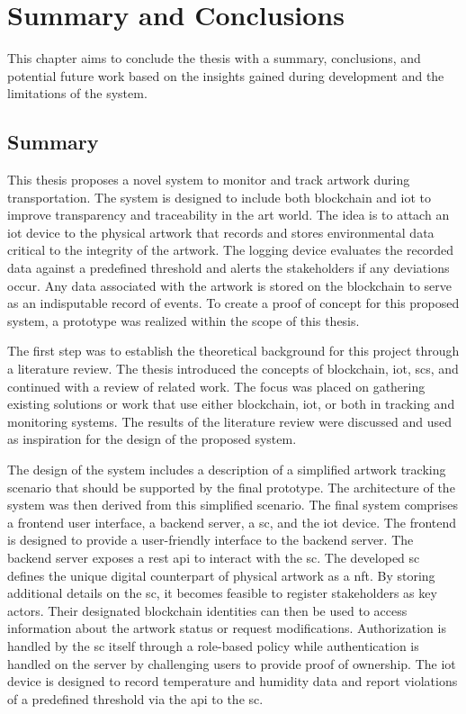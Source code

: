 \chapter{Summary and Conclusions}
\label{chap:summary}
This chapter aims to conclude the thesis with a summary, conclusions, and potential future work based on the insights gained during development and the limitations of the system.

\section{Summary}
This thesis proposes a novel system to monitor and track artwork during transportation. The system is designed to include both blockchain and \gls{iot} to improve transparency and traceability in the art world. The idea is to attach an \gls{iot} device to the physical artwork that records and stores environmental data critical to the integrity of the artwork. The logging device evaluates the recorded data against a predefined threshold and alerts the stakeholders if any deviations occur. Any data associated with the artwork is stored on the blockchain to serve as an indisputable record of events. To create a proof of concept for this proposed system, a prototype was realized within the scope of this thesis.

The first step was to establish the theoretical background for this project through a literature review. The thesis introduced the concepts of blockchain, \gls{iot}, \glspl{sc}, and continued with a review of related work. The focus was placed on gathering existing solutions or work that use either blockchain, \gls{iot}, or both in tracking and monitoring systems. The results of the literature review were discussed and used as inspiration for the design of the proposed system.

The design of the system includes a description of a simplified artwork tracking scenario that should be supported by the final prototype. The architecture of the system was then derived from this simplified scenario. The final system comprises a frontend user interface, a backend server, a \gls{sc}, and the \gls{iot} device. The frontend is designed to provide a user-friendly interface to the backend server. The backend server exposes a \gls{rest} \gls{api} to interact with the \gls{sc}. The developed \gls{sc} defines the unique digital counterpart of physical artwork as a \gls{nft}. By storing additional details on the \gls{sc}, it becomes feasible to register stakeholders as key actors. Their designated blockchain identities can then be used to access information about the artwork status or request modifications. Authorization is handled by the \gls{sc} itself through a role-based policy while authentication is handled on the server by challenging users to provide proof of ownership. The \gls{iot} device is designed to record temperature and humidity data and report violations of a predefined threshold via the \gls{api} to the \gls{sc}.

